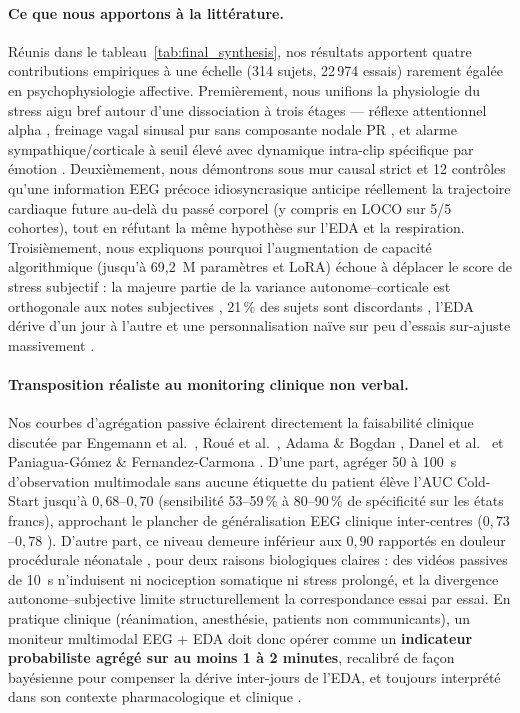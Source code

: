\documentclass[10pt]{article}
\begin{document}
\paragraph{Ce que nous apportons à la littérature.}
Réunis dans le tableau~\ref{tab:final_synthesis}, nos résultats apportent quatre contributions empiriques à une échelle (314 sujets, 22\,974 essais) rarement égalée en psychophysiologie affective. Premièrement, nous unifions la physiologie du stress aigu bref autour d'une dissociation à trois étages — réflexe attentionnel alpha \cite{codispoti2023,stegmann2024}, freinage vagal sinusal pur sans composante nodale PR \cite{somsen2002,abercrombie2008}, et alarme sympathique/corticale à seuil élevé avec dynamique intra-clip spécifique par émotion \cite{si2026,qin2023}. Deuxièmement, nous démontrons sous mur causal strict et 12 contrôles qu'une information EEG précoce idiosyncrasique anticipe réellement la trajectoire cardiaque future au-delà du passé corporel (y compris en LOCO sur 5/5 cohortes), tout en réfutant la même hypothèse sur l'EDA et la respiration. Troisièmement, nous expliquons pourquoi l'augmentation de capacité algorithmique (jusqu'à 69,2~M paramètres et LoRA) échoue à déplacer le score de stress subjectif : la majeure partie de la variance autonome--corticale est orthogonale aux notes subjectives \cite{cuve2023}, 21\,\% des sujets sont discordants \cite{brown2019}, l'EDA dérive d'un jour à l'autre \cite{sakimura2025} et une personnalisation naïve sur peu d'essais sur-ajuste massivement \cite{khan2026}.

\paragraph{Transposition réaliste au monitoring clinique non verbal.}
Nos courbes d'agrégation passive éclairent directement la faisabilité clinique discutée par Engemann et al.\ \cite{engemann2018}, Roué et al.\ \cite{roue2025}, Adama \& Bogdan \cite{adama2025}, Danel et al.\ \cite{danel2025} et Paniagua-Gómez \& Fernandez-Carmona \cite{paniagua2025}. D'une part, agréger 50 à 100~s d'observation multimodale sans aucune étiquette du patient élève l'AUC Cold-Start jusqu'à $0{,}68$--$0{,}70$ (sensibilité 53--59\,\% à 80--90\,\% de spécificité sur les états francs), approchant le plancher de généralisation EEG clinique inter-centres ($0{,}73$--$0{,}78$ \cite{engemann2018}). D'autre part, ce niveau demeure inférieur aux $0{,}90$ rapportés en douleur procédurale néonatale \cite{roue2025}, pour deux raisons biologiques claires : des vidéos passives de 10~s n'induisent ni nociception somatique ni stress prolongé, et la divergence autonome--subjective limite structurellement la correspondance essai par essai. En pratique clinique (réanimation, anesthésie, patients non communicants), un moniteur multimodal EEG + EDA doit donc opérer comme un \textbf{indicateur probabiliste agrégé sur au moins 1 à 2 minutes}, recalibré de façon bayésienne pour compenser la dérive inter-jours de l'EDA, et toujours interprété dans son contexte pharmacologique et clinique \cite{danel2025}.
\end{document}
